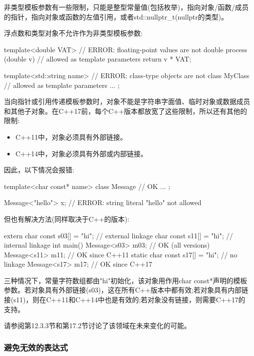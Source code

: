 非类型模板参数有一些限制，只能是整型常量值(包括枚举)，指向对象/函数/成员的指针，指向对象或函数的左值引用，或者std::nullptr\_t(nullptr的类型)。

浮点数和类型对象不允许作为非类型模板参数:

\begin{cpp}
template<double VAT> // ERROR: floating-point values are not
double process (double v) // allowed as template parameters
{
	return v * VAT;
}

template<std::string name> // ERROR: class-type objects are not
class MyClass { // allowed as template parameters
	...
};
\end{cpp}

当向指针或引用传递模板参数时，对象不能是字符串字面值、临时对象或数据成员和其他子对象。在C++17前，每个C++版本都放宽了这些限制，所以还有其他的限制:

\begin{itemize}
\item 
C++11中，对象必须具有外部链接。

\item 
C++14中，对象必须具有外部或内部链接。
\end{itemize}

因此，以下情况会报错:

\begin{cpp}
template<char const* name>
class Message { // OK
	...
};

Message<"hello"> x; // ERROR: string literal "hello" not allowed
\end{cpp}

但也有解决方法(同样取决于C++的版本):

\begin{cpp}
extern char const s03[] = "hi"; // external linkage
char const s11[] = "hi"; // internal linkage
int main()
{
	Message<s03> m03; // OK (all versions)
	Message<s11> m11; // OK since C++11
	static char const s17[] = "hi"; // no linkage
	Message<s17> m17; // OK since C++17
}
\end{cpp}

三种情况下，常量字符数组都由"hi"初始化，该对象用作用char const*声明的模板参数。若对象具有外部链接(s03)，这在所有C++版本中都有效;若对象具有内部链接(s11)，则在C++11和C++14中也是有效的;若对象没有链接，则需要C++17的支持。

请参阅第12.3.3节和第17.2节讨论了该领域在未来变化的可能。

\subsubsection{避免无效的表达式}

